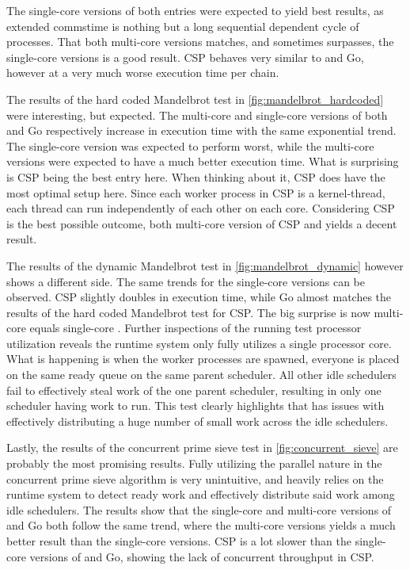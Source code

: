 The single\hyp{}core versions of both entries were expected to yield best results, as extended commstime is nothing but a long sequential dependent cycle of processes. That both multi\hyp{}core versions matches, and sometimes surpasses, the single\hyp{}core versions is a good result. \Cpp{}CSP behaves very similar to \Proxc{} and Go, however at a very much worse execution time per chain. 

The results of the hard coded Mandelbrot test in \cref{fig:mandelbrot_hardcoded} were interesting, but expected. The multi\hyp{}core and single\hyp{}core versions of both \Proxc{} and Go respectively increase in execution time with the same exponential trend. The single\hyp{}core version was expected to perform worst, while the multi\hyp{}core versions were expected to have a much better execution time. What is surprising is \Cpp{}CSP being the best entry here. When thinking about it, \Cpp{}CSP does have the most optimal setup here. Since each worker process in \Cpp{}CSP is a kernel\hyp{}thread, each thread can run independently of each other on each core. Considering \Cpp{}CSP is the best possible outcome, both multi\hyp{}core version of \Cpp{}CSP and \Proxc{} yields a decent result.

The results of the dynamic Mandelbrot test in \cref{fig:mandelbrot_dynamic} however shows a different side. The same trends for the single\hyp{}core versions can be observed. \Cpp{}CSP slightly doubles in execution time, while Go almost matches the results of the hard coded Mandelbrot test for \Cpp{}CSP. The big surprise is now multi\hyp{}core \Proxc{} equals single\hyp{}core \Proxc{}. Further inspections of the running test processor utilization reveals the runtime system only fully utilizes a single processor core. What is happening is when the worker processes are spawned, everyone is placed on the same ready queue on the same parent scheduler. All other idle schedulers fail to effectively steal work of the one parent scheduler, resulting in only one scheduler having work to run. This test clearly highlights that \Proxc{} has issues with effectively distributing a huge number of small work across the idle schedulers.

Lastly, the results of the concurrent prime sieve test in \cref{fig:concurrent_sieve} are probably the most promising results. Fully utilizing the parallel nature in the concurrent prime sieve algorithm is very unintuitive, and heavily relies on the runtime system to detect ready work and effectively distribute said work among idle schedulers. The results show that the single\hyp{}core and multi\hyp{}core versions of \Proxc{} and Go both follow the same trend, where the multi\hyp{}core versions yields a much better result than the single\hyp{}core versions. \Cpp{}CSP is a lot slower than the single\hyp{}core versions of \Proxc{} and Go, showing the lack of concurrent throughput in \Cpp{}CSP. 

